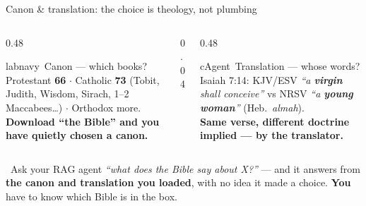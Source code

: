 \begin{frame}{Canon \& translation: the choice is theology, not plumbing}
  \begin{columns}[t, totalwidth=\textwidth]
    \begin{column}{0.48\textwidth}
      \begin{featbox}{labnavy}{\faBook\ Canon --- which books?}
        \scriptsize
        Protestant \textbf{66} $\cdot$ Catholic \textbf{73} (Tobit, Judith, Wisdom,
        Sirach, 1--2 Maccabees\dots) $\cdot$ Orthodox more.
        \\[3pt]\textbf{Download ``the Bible'' and you have quietly chosen a canon.}
      \end{featbox}
    \end{column}
    \begin{column}{0.04\textwidth}\end{column}
    \begin{column}{0.48\textwidth}
      \begin{featbox}{cAgent}{\faLanguage\ Translation --- whose words?}
        \scriptsize
        Isaiah 7:14: KJV/ESV \emph{``a \textbf{virgin} shall conceive''} vs NRSV
        \emph{``a \textbf{young woman}''} (Heb.\ \emph{almah}).
        \\[3pt]\textbf{Same verse, different doctrine implied --- by the translator.}
      \end{featbox}
    \end{column}
  \end{columns}
  \vspace{8pt}
  \begin{calloutbox}[accentgold]
    \small\faQuestionCircle\ Ask your RAG agent \emph{``what does the Bible say about X?''}
    --- and it answers from \textbf{the canon and translation you loaded}, with no idea
    it made a choice. \textbf{You} have to know which Bible is in the box.
  \end{calloutbox}
\end{frame}

